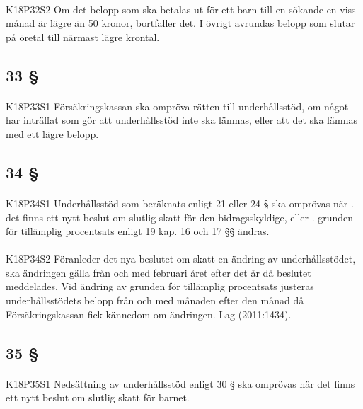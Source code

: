 \documentclass[a4paper,notitlepage,openany,10pt]{book}
\begin{document}
\paragraph*{}
{\tiny K18P32S2}
Om det belopp som ska betalas ut för ett barn till en sökande en viss månad är lägre än 50 kronor, bortfaller det. I övrigt avrundas belopp som slutar på öretal till närmast lägre krontal.
\subsection*{33 §}
\paragraph*{}
{\tiny K18P33S1}
Försäkringskassan ska ompröva rätten till underhållsstöd, om något har inträffat som gör att underhållsstöd inte ska lämnas, eller att det ska lämnas med ett lägre belopp.
\subsection*{34 §}
\paragraph*{}
{\tiny K18P34S1}
Underhållsstöd som beräknats enligt 21 eller 24 § ska omprövas när
. det finns ett nytt beslut om slutlig skatt för den bidragsskyldige, eller
. grunden för tillämplig procentsats enligt 19 kap. 16 och 17 §§ ändras.
\paragraph*{}
{\tiny K18P34S2}
Föranleder det nya beslutet om skatt en ändring av underhållsstödet, ska ändringen gälla från och med februari året efter det år då beslutet meddelades. Vid ändring av grunden för tillämplig procentsats justeras underhållsstödets belopp från och med månaden efter den månad då Försäkringskassan fick kännedom om ändringen.
Lag (2011:1434).
\subsection*{35 §}
\paragraph*{}
{\tiny K18P35S1}
Nedsättning av underhållsstöd enligt 30 § ska omprövas när det finns ett nytt beslut om slutlig skatt för barnet.
\end{document}
